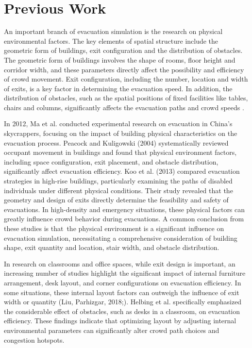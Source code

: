 \section{Previous Work}
An important branch of evacuation simulation is the research on physical environmental factors. The key elements of spatial structure include the geometric form of buildings, exit configuration and the distribution of obstacles. The geometric form of buildings involves the shape of rooms, floor height and corridor width, and these parameters directly affect the possibility and efficiency of crowd movement. Exit configuration, including the number, location and width of exits, is a key factor in determining the evacuation speed. In addition, the distribution of obstacles, such as the spatial positions of fixed facilities like tables, chairs and columns, significantly affects the evacuation paths and crowd speeds .

In 2012, Ma et al. conducted experimental research on evacuation in China's skycrappers, focusing on the impact of building physical characteristics on the evacuation process. Peacock and Kuligowski (2004) systematically reviewed occupant movement in buildings and found that physical environment factors, including space configuration, exit placement, and obstacle distribution, significantly affect evacuation efficiency. Koo et al. (2013) compared evacuation strategies in high-rise buildings, particularly examining the paths of disabled individuals under different physical conditions. Their study revealed that the geometry and design of exits directly determine the feasibility and safety of evacuations. In high-density and emergency situations, these physical factors can greatly influence crowd behavior during evacuations. A common conclusion from these studies is that the physical environment is a significant influence on evacuation simulation, necessitating a comprehensive consideration of building shape, exit quantity and location, stair width, and obstacle distribution.

In research on classrooms and office spaces, while exit design is important, an increasing number of studies highlight the significant impact of internal furniture arrangement, desk layout, and corner configurations on evacuation efficiency. In some situations, these internal layout factors can outweigh the influence of exit width or quantity (Liu, Parhizgar, 2018;). Helbing et al. specifically emphasized the considerable effect of obstacles, such as desks in a classroom, on evacuation efficiency. These findings indicate that optimizing layout by adjusting internal environmental parameters can significantly alter crowd path choices and congestion hotspots.

